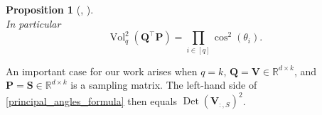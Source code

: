\documentclass[twoside,11pt]{book}
\newtheorem{proposition}{Proposition}
\newtheorem{example}{Example}
\numberwithin{theorem}{chapter}
\numberwithin{definition}{chapter}
\numberwithin{proposition}{chapter}
\numberwithin{corollary}{chapter}
\numberwithin{example}{chapter}
\numberwithin{lemma}{chapter}
\numberwithin{assumption}{chapter}
\numberwithin{equation}{chapter}
\numberwithin{figure}{chapter}
\DeclareMathOperator{\Det}{Det}
\DeclareMathOperator{\Vol}{Vol}
\DeclareMathOperator{\Tran}{\intercal}
\newcommand{\ab}[1]{\textcolor{red}{#1}}
\begin{document}
\begin{subappendices}
\begin{proposition}[\citealp{BjGo73}, \citealp{Ben92}]
\begin{equation}
\end{equation}
In particular
\begin{equation}\label{principal_angles_formula}
\Vol_{q}^{2}(\bm{Q}^{\Tran}\bm{P}) = \prod\limits_{i \in [q]} \cos^{2}(\theta_{i}).
\end{equation}
\end{proposition}
An important case for our work arises when $q=k$, $\bm{Q}=\bm{V} \in \mathbb{R}^{d \times k}$, and $\bm{P}=\bm{S}\in \mathbb{R}^{d \times k}$ is a sampling matrix. The left-hand side of \eqref{principal_angles_formula} then equals $\Det(\bm{V}_{:,S})^2$.



%    


\end{subappendices}
\end{document}
